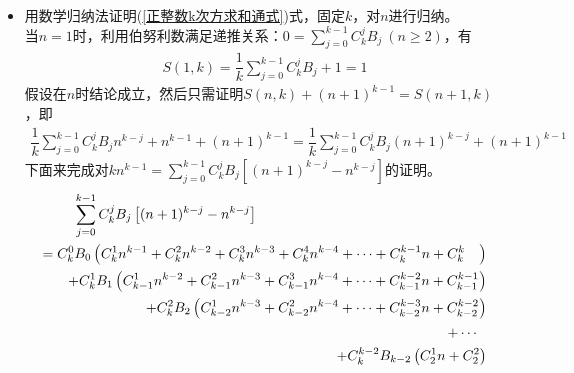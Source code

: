 \begin{itemize}[leftmargin=\inteval{\myitemleftmargin}pt,itemsep=
   \inteval{\myitemitempsep}pt,topsep=\inteval{\myitemtopsep}pt]
\begin{align*}
\end{align*}
该规律就是：$ \dfrac{\partial S}{\partial n}(n,k+1)=kS(n,k)+B_k $，证明如下：
\begin{align*}
    &\dfrac{\partial S}{\partial n}\left(\dfrac{1}{k+1}\sum_{j=0}^{k}
    C_{k+1}^{j}B_{j}n^{k+1-j}+n^{k}\right)-B_k\\
    =&\sum_{j=0}^{k}\dfrac{k+1-j}{k+1}C_{k+1}^{j}B_{j}n^{k-j}+kn^{k-1}-B_k \\
    =&\sum_{j=0}^{k-1}C_{k}^{j}B_{j}n^{k-j}+kn^{k-1} \\
    =&k\left(\dfrac{1}{k}\sum_{j=0}^{k-1}C_{k}^{j}B_{j}n^{k-j}+n^{k-1} \right)  \\
    =&kS(n,k)
\end{align*}
上面用到了$ \dfrac{k+1-j}{k+1}C_{k+1}^j=\dfrac{k+1-j}{k+1}\cdot\dfrac{(k+1)!}{(k+1-j)!j!}
=\dfrac{k!}{(k-j)!j!}=C_k^j $.
\item 用数学归纳法证明(\ref{正整数k次方求和通式})式，固定$ k $，对$ n $进行归纳。\\
当$ n=1 $时，利用伯努利数满足递推关系：$ 0=\sum\limits_{j=0}^{k-1}C_k^jB_j\ (n\geq 2) $，有
\begin{align*}
    S(1,k)=\dfrac{1}{k}\sum_{j=0}^{k-1}C_{k}^{j}B_{j}+1=1
\end{align*}
假设在$ n $时结论成立，然后只需证明$ S(n,k)+(n+1)^{k-1}=S(n+1,k) $，即
\begin{align*}
    \dfrac{1}{k}\sum_{j=0}^{k-1}C_{k}^{j}B_{j}n^{k-j}+n^{k-1}+(n+1)^{k-1}
    =\dfrac{1}{k}\sum_{j=0}^{k-1}C_{k}^{j}B_{j}(n+1)^{k-j}+(n+1)^{k-1}
\end{align*}
下面来完成对$ kn^{k-1} =\sum\limits_{j=0}^{k-1}C_{k}^{j}B_{j}\left[
(n+1)^{k-j}-n^{k-j}\right] $的证明。
{\small \begin{align*}
        \sum\limits_{j=0}^{k-1}C_{k}^{j}B_{j}\left[(n+1)^{k-j}-n^{k-j}\right] 
        \hspace{5.8cm} &  \\
        = C_k^0B_0\left(C_k^1n^{k-1}+C_k^2n^{k-2}+C_k^3n^{k-3}+C_k^4n^{k-4}+\cdots+C_k^{k-1}n+C_k^k\quad \right) &\\
        + C_k^1B_1\left(C_{k-1}^1n^{k-2}+C_{k-1}^2n^{k-3}+C_{k-1}^3n^{k-4}+\cdots+C_{k-1}^{k-2}n
        + C_{k-1}^{k-1}\right) & \\
        + C_k^2B_2\left(C_{k-2}^1n^{k-3}+C_{k-2}^2n^{k-4}+\cdots+C_{k-2}^{k-3}n
        + C_{k-2}^{k-2}\right) & \\
        +\cdots\ \ & \\
        + C_k^{k-2}B_{k-2}\left(C_2^1n+C_2^2 \right) & \\

\end{align*}}
\end{itemize}
